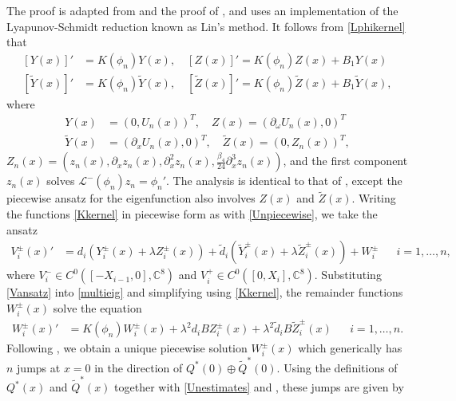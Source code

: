\documentclass[12pt]{elsarticle}
\def\C{{\mathbb C}}
\def\calL{{\mathcal L}}
\begin{document}
The proof is adapted from \cite[Section 3.4]{Manukian} and the proof of \cite[Theorem 2]{Sandstede1998}, and uses an implementation of the Lyapunov-Schmidt reduction known as Lin's method. It follows from \cref{Lphikernel} that
\begin{equation}\label{Kkernel}
\begin{aligned}
[Y(x)]' &= K(\phi_n)Y(x), \quad [Z(x)]' = K(\phi_n)Z(x) + B_1 Y(x) \\
[\tilde{Y}(x)]' &= K(\phi_n)\tilde{Y}(x), \quad [\tilde{Z}(x)]' = K(\phi_n)\tilde{Z}(x) + B_1 \tilde{Y}(x),
\end{aligned}
\end{equation}
where
\begin{equation}
\begin{aligned}
Y(x) &= ( 0, U_n(x) )^T, \quad
Z(x) = ( \partial_\omega U_n(x), 0 )^T \\
\tilde{Y}(x) &= ( \partial_x U_n(x), 0)^T, \quad
\tilde{Z}(x) = ( 0, Z_n(x) )^T,
\end{aligned}
\end{equation}
$Z_n(x) = (z_n(x), \partial_x z_n(x), \partial_x^2 z_n(x), \frac{\beta_4}{24} \partial_x^3 z_n(x))$, and the first component $z_n(x)$ solves $\calL^-(\phi_n)z_n = \phi_n'$. The analysis is identical to that of \cite{Manukian}, except the piecewise ansatz for the eigenfunction also involves $Z(x)$ and $\tilde{Z}(x)$. Writing the functions \cref{Kkernel} in piecewise form as with \cref{Unpiecewise}, we take the ansatz
\begin{align}\label{Vansatz}
V_i^\pm(x)' &= d_i(Y_i^\pm(x) + \lambda Z_i^\pm(x)) + \tilde{d}_i(\tilde{Y}_i^\pm(x) + \lambda \tilde{Z}_i^\pm(x)) + W_i^\pm && i = 1, \dots, n,
\end{align}
where $V_i^- \in C^0( [-X_{i-1}, 0], \C^8 )$ and $V_i^+ \in C^0( [0, X_i], \C^8 )$. Substituting \cref{Vansatz} into \cref{multieig} and simplifying using \cref{Kkernel}, the remainder functions $W_i^\pm(x)$ solve the equation
\begin{align}\label{Wsolves}
W_i^\pm(x)' &= K(\phi_n)W_i^\pm(x) + \lambda^2 d_i B Z_i^\pm(x) + \lambda^2 \tilde{d}_i B \tilde{Z}_i^\pm(x) && i = 1, \dots, n.
\end{align}
Following \cite{Manukian,Sandstede1998}, we obtain a unique piecewise solution $W_i^\pm(x)$ which generically has $n$ jumps at $x = 0$ in the direction of $Q^*(0) \oplus \tilde{Q}^*(0)$. Using the definitions of $Q^*(x)$ and $\tilde{Q}^*(x)$ together with \cref{Unestimates} and \cite[(3.19)]{Manukian}, these jumps are given by
\end{document}

